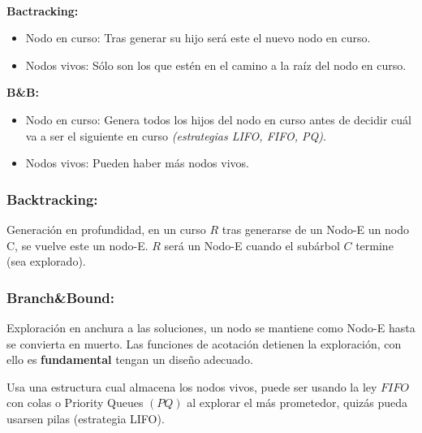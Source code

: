 \documentclass[tikz,11pt,fleqn]{book} %
\begin{document}
\begin{theorem}[Diferencias]~

	\textbf{Bactracking:}
	\begin{itemize}
		\item Nodo en curso: Tras generar su hijo será este el nuevo nodo en curso.
		\item Nodos vivos: Sólo son los que estén en el camino a la raíz del nodo en curso.
	\end{itemize}

	\textbf{B\&B:}
	\begin{itemize}
		\item Nodo en curso: Genera todos los hijos del nodo en curso antes de decidir cuál va a ser el siguiente en curso \textit{(estrategias LIFO, FIFO, PQ)}.
		\item Nodos vivos: Pueden haber más nodos vivos.
	\end{itemize}
\end{theorem}

\subsubsection{Backtracking:}
Generación en profundidad, en un curso $R$ tras generarse de un Nodo-E un nodo C, se vuelve este un nodo-E.
$R$ será un Nodo-E cuando el subárbol $C$ termine (sea explorado).

\subsubsection{Branch\&Bound:}
Exploración en anchura a las soluciones, un nodo se mantiene como Nodo-E hasta se convierta en muerto. Las funciones de acotación detienen la exploración, con ello es \textbf{fundamental} tengan un diseño adecuado.

Usa una estructura cual almacena los nodos vivos, puede ser usando la ley $FIFO$ con colas o Priority Queues $(PQ)$ al explorar el más prometedor, quizás pueda usarsen pilas (estrategia LIFO).
\end{document}
